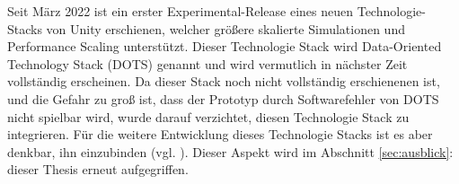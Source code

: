 Seit März 2022 ist ein erster Experimental-Release eines neuen Technologie-Stacks von Unity erschienen, welcher größere skalierte Simulationen und Performance Scaling unterstützt. Dieser Technologie Stack wird Data-Oriented Technology Stack (DOTS) genannt und wird vermutlich in nächster Zeit vollständig erscheinen. Da dieser Stack noch nicht vollständig erschienenen ist, und die Gefahr zu groß ist, dass der Prototyp durch Softwarefehler von DOTS nicht spielbar wird, wurde darauf verzichtet, diesen Technologie Stack zu integrieren. Für die weitere Entwicklung dieses Technologie Stacks ist es aber denkbar, ihn einzubinden  (vgl. \cite{technologies_dots_nodate}). Dieser Aspekt wird im Abschnitt \ref{sec:ausblick}:  dieser Thesis erneut aufgegriffen.
